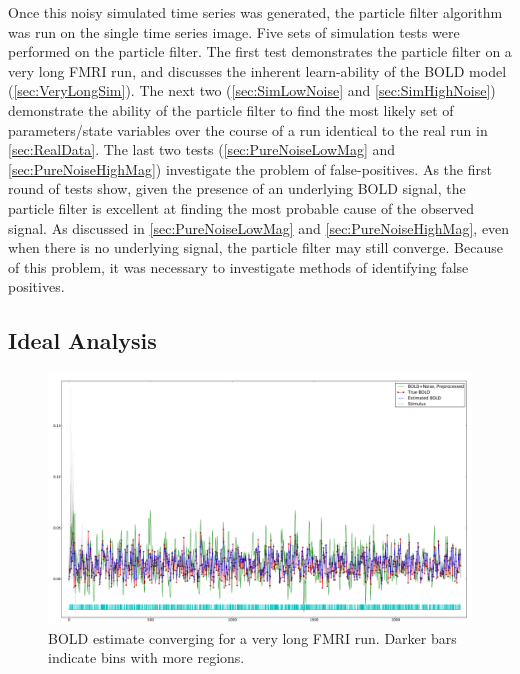 Once this noisy simulated time series was generated, the particle filter algorithm
was run on the single time series image. Five sets of simulation tests
were performed on the particle filter.
The first test demonstrates the particle filter on a very long FMRI
run, and discusses the inherent learn-ability of the BOLD model
(\autoref{sec:VeryLongSim}).
The next two (\autoref{sec:SimLowNoise} and \autoref{sec:SimHighNoise})
demonstrate the ability of the particle filter to find the most likely
set of parameters/state variables over the course of a run identical to the
real run in \autoref{sec:RealData}. The last two
tests (\autoref{sec:PureNoiseLowMag} and \autoref{sec:PureNoiseHighMag})
investigate the problem of false-positives. As the first
round of tests show, given the presence of an underlying BOLD signal,
the particle filter is excellent at finding the most probable cause of
the observed signal. As discussed in \autoref{sec:PureNoiseLowMag} and
\autoref{sec:PureNoiseHighMag}, even when there is no underlying signal,
the particle filter may still converge. Because of this problem, it was
necessary to investigate methods of identifying false positives.

\subsection{Ideal Analysis}
\label{sec:VeryLongSim}

\begin{figure}
\centering
\includegraphics[clip=true,trim=1cm 0cm 0cm 0cm, width=17cm]{images/long_converge}
\caption{BOLD estimate converging for a very long FMRI run. Darker bars indicate
bins with more regions. }
\label{fig:long_converge}
\end{figure}


